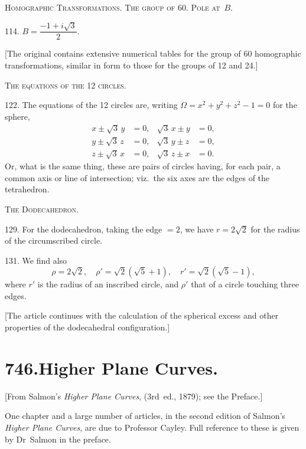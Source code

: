 \documentclass[12pt,a4paper]{article}
\begin{document}
\medskip

\noindent\textsc{Homographic Transformations. The group of 60. Pole at~$B$.}

114. $B = \dfrac{-1+i\sqrt{3}}{2}$.

[The original contains extensive numerical tables for the group of 60 homographic transformations, similar in form to those for the groups of 12 and 24.]

\medskip

\noindent\textsc{The equations of the 12 circles.}

122. The equations of the 12 circles are, writing $\Omega = x^2 + y^2 + z^2 - 1 = 0$ for the sphere,
\begin{align*}
x \pm \sqrt{3}\,y &= 0, & \sqrt{3}\,x \pm y &= 0, \\
y \pm \sqrt{3}\,z &= 0, & \sqrt{3}\,y \pm z &= 0, \\
z \pm \sqrt{3}\,x &= 0, & \sqrt{3}\,z \pm x &= 0.
\end{align*}
Or, what is the same thing, these are pairs of circles having, for each pair, a common axis or line of intersection; viz.~the six axes are the edges of the tetrahedron.

\medskip

\noindent\textsc{The Dodecahedron.}

129. For the dodecahedron, taking the edge $= 2$, we have $r = 2\sqrt{2}$ for the radius of the circumscribed circle.

131. We find also
\[
\rho = 2\sqrt{2},\quad \rho' = \sqrt{2}(\sqrt{5}+1),\quad r' = \sqrt{2}(\sqrt{5}-1),
\]
where $r'$ is the radius of an inscribed circle, and $\rho'$ that of a circle touching three edges.

[The article continues with the calculation of the spherical excess and other properties of the dodecahedral configuration.]


\newpage
\section*{\textbf{746.}\quad Higher Plane Curves.}

[From Salmon's \textit{Higher Plane Curves}, (3rd~ed., 1879); see the Preface.]

\medskip

One chapter and a large number of articles, in the second edition of Salmon's \textit{Higher Plane Curves}, are due to Professor Cayley. Full reference to these is given by Dr~Salmon in the preface.
\end{document}
